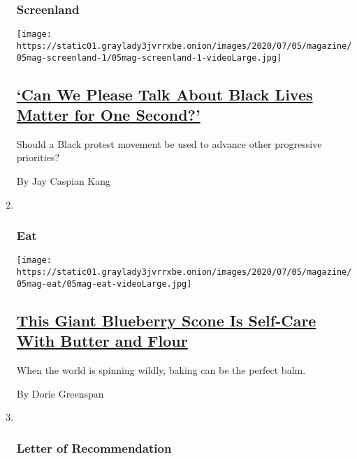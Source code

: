 \begin{enumerate}
{  \subsubsection{Screenland}\label{screenland}}

  \texttt{[image: https://static01.graylady3jvrrxbe.onion/images/2020/07/05/magazine/05mag-screenland-1/05mag-screenland-1-videoLarge.jpg]}

  \hypertarget{can-we-please-talk-about-black-lives-matter-for-one-second}{%
  \subsection{\texorpdfstring{\href{/2020/07/02/magazine/can-we-please-talk-about-black-lives-matter-for-one-second.html}{`Can
  We Please Talk About Black Lives Matter for One
  Second?'}}{`Can We Please Talk About Black Lives Matter for One Second?'}}\label{can-we-please-talk-about-black-lives-matter-for-one-second}}

  Should a Black protest movement be used to advance other progressive
  priorities?

  By Jay Caspian Kang
\item ~
  \hypertarget{eat}{%
  \subsubsection{Eat}\label{eat}}

  \texttt{[image: https://static01.graylady3jvrrxbe.onion/images/2020/07/05/magazine/05mag-eat/05mag-eat-videoLarge.jpg]}

  \hypertarget{this-giant-blueberry-scone-is-self-care-with-butter-and-flour}{%
  \subsection{\texorpdfstring{\href{/2020/07/01/magazine/this-giant-blueberry-scone-is-self-care-with-butter-and-flour.html}{This
  Giant Blueberry Scone Is Self-Care With Butter and
  Flour}}{This Giant Blueberry Scone Is Self-Care With Butter and Flour}}\label{this-giant-blueberry-scone-is-self-care-with-butter-and-flour}}

  When the world is spinning wildly, baking can be the perfect balm.

  By Dorie Greenspan
\item ~
  \hypertarget{letter-of-recommendation}{%
  \subsubsection{Letter of
  Recommendation}\label{letter-of-recommendation}}


\end{enumerate}
